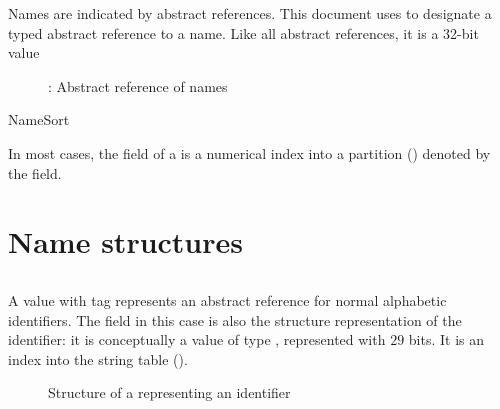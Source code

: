 \label{sec:ifc-names}

Names are indicated by abstract references.  This document
uses  to designate a typed abstract reference to a
name.  Like all abstract references, it is a 32-bit value
\begin{figure}[H]
  \centering
  \caption{: Abstract reference of names}
  \label{fig:ifc-name-index}
\end{figure}

\begin{SortEnum}{NameSort}
\end{SortEnum}

\noindent
In most cases, the  field of a  is a numerical index into a partition () denoted by the  field.

\section{Name structures}
\label{sec:ifc:name-structures}

\subsection{}
\label{sec:ifc:NameSort:Identifier}

A  value with tag  represents an abstract reference for normal alphabetic identifiers.
The  field in this case is also the structure representation of the identifier: it is conceptually a value of 
type , represented with $29$ bits.  It is an index into the string table ().
\begin{figure}[H]
  \centering
  \caption{Structure of a  representing an identifier}
  \label{fig:ifc-identifier-structure}
\end{figure}


